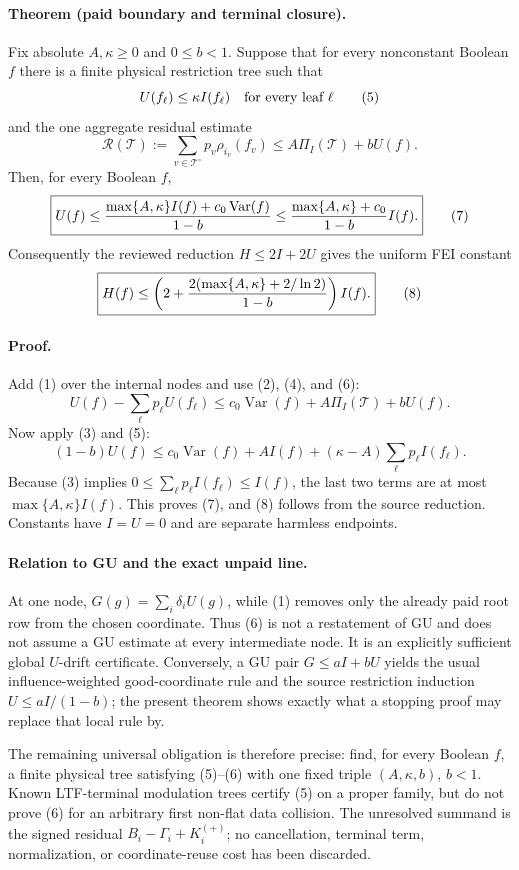 \paragraph{Theorem (paid boundary and terminal closure).}
Fix absolute $A,\kappa\ge0$ and $0\le b<1$.  Suppose that for every
nonconstant Boolean $f$ there is a finite physical restriction tree such
that
\[
 U(f_\ell)\le\kappa I(f_\ell)\quad\hbox{for every leaf }\ell             \tag{5}
\]
and the one aggregate residual estimate
\[
 \mathcal R(\mathcal T):=
 \sum_{v\in\mathcal T^\circ}p_v\rho_{i_v}(f_v)
 \le A\Pi_I(\mathcal T)+bU(f).                                         \tag{6}
\]
Then, for every Boolean $f$,
\[
 \boxed{U(f)\le
 {\max\{A,\kappa\}I(f)+c_0\operatorname{Var}(f)\over1-b}
 \le {\max\{A,\kappa\}+c_0\over1-b}I(f).}                            \tag{7}
\]
Consequently the reviewed reduction $H\le2I+2U$ gives the uniform FEI
constant
\[
 \boxed{H(f)\le
 \left(2+{2(\max\{A,\kappa\}+2/\ln2)\over1-b}\right)I(f).}            \tag{8}
\]

\paragraph{Proof.}
Add (1) over the internal nodes and use (2), (4), and (6):
\[
 U(f)-\sum_\ell p_\ell U(f_\ell)
 \le c_0\operatorname{Var}(f)+A\Pi_I(\mathcal T)+bU(f).
\]
Now apply (3) and (5):
\[
 (1-b)U(f)
 \le c_0\operatorname{Var}(f)+A I(f)
       +(\kappa-A)\sum_\ell p_\ell I(f_\ell).
\]
Because (3) implies $0\le\sum_\ell p_\ell I(f_\ell)\le I(f)$, the last
two terms are at most $\max\{A,\kappa\}I(f)$.  This proves (7), and (8)
follows from the source reduction.  Constants have $I=U=0$ and are
separate harmless endpoints.

\paragraph{Relation to GU and the exact unpaid line.}
At one node, $G(g)=\sum_i\delta_iU(g)$, while (1) removes only the already
paid root row from the chosen coordinate.  Thus (6) is not a restatement
of GU and does not assume a GU estimate at every intermediate node.  It is
an explicitly sufficient global $U$-drift certificate.  Conversely, a GU
pair $G\le aI+bU$ yields the usual influence-weighted good-coordinate rule
and the source restriction induction $U\le aI/(1-b)$; the present theorem
shows exactly what a stopping proof may replace that local rule by.

The remaining universal obligation is therefore precise: find, for every
Boolean $f$, a finite physical tree satisfying (5)--(6) with one fixed
triple $(A,\kappa,b)$, $b<1$.  Known LTF-terminal modulation trees certify
(5) on a proper family, but do not prove (6) for an arbitrary first
non-flat data collision.  The unresolved summand is the signed residual
$B_i-\Gamma_i+K_i^{(+)}$; no cancellation, terminal term, normalization,
or coordinate-reuse cost has been discarded.
